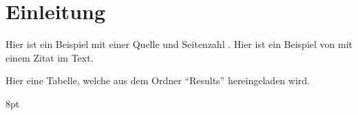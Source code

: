 \documentclass[12pt, twoside = false, bibliography=totoc]{scrbook}
\begin{document}


\frontmatter

\tableofcontents

\listoffigures
{}
\vspace*{24pt}
{\let\clearpage\relax \listoftables}	

\mainmatter

\chapter{Einleitung}\label{Einleitung} %

Hier ist ein Beispiel mit einer Quelle und Seitenzahl \parencite[S. 103]{wangnerud_2009}. Hier ist ein Beispiel von \textcite{erikson_2018} mit einem Zitat im Text.

Hier eine Tabelle, welche aus dem Ordner \enquote{Results} hereingeladen wird.

{8pt}
\printbibliography[title={Literaturverzeichnis}]

    
\end{document}
